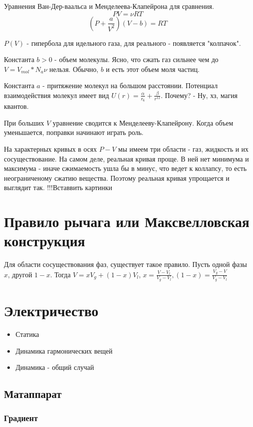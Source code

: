 \documentclass{article}
\begin{document}
Уравнения Ван-Дер-ваальса и Менделеева-Клапейрона для сравнения.
$$PV = \nu RT$$
$$(P + \frac{a}{V^2})(V-b) = RT$$

$P(V)$ - гипербола для идельного  газа, для реального - появляется "колпачок". 

Константа $b>0$ - объем молекулы. Ясно, что сжать газ сильнее чем до $V = V_{mol}*N_a\nu$ нельзя. Обычно, $b$ и есть этот объем моля частиц. 

Константа $a$ - притяжение молекул на большом расстоянии. Потенциал взаимодействия молекул имеет вид $U(r) = \frac{\alpha}{r_6} + \frac{\beta}{r^{12}}$. Почему? - Ну, хз, магия квантов. 

При больших $V$ уравнение сводится к Менделееву-Клапейрону. Когда объем уменьшается, поправки начинают играть роль.

На характерных кривых  в осях $P-V$ мы имеем три области - газ, жидкость и их сосуществование. На самом деле, реальная кривая проще. В ней нет минимума и максимума - иначе сжимаемость ушла бы в минус, что ведет к коллапсу, то есть неограниченому сжатию вещества. Поэтому реальная кривая упрощается и выглядит так.
!!!Вставвить картинки

\section{Правило рычага или Максвелловская конструкция}

Для области сосуществования фаз, существует такое правило. Пусть одной фазы $x$, другой $1-x$. Тогда $V = xV_g + (1-x)V_l$, $x = \frac{V-V_l}{V_g-V_l}, (1-x) = \frac{V_g-V}{V_g-V_l}$

\section{Электричество}
\begin{itemize}
\item Статика
\item Динамика гармонических вещей
\item Динамика - общий случай
\end{itemize}

\subsection{Матаппарат}

\subsubsection{Градиент}
\end{document}
